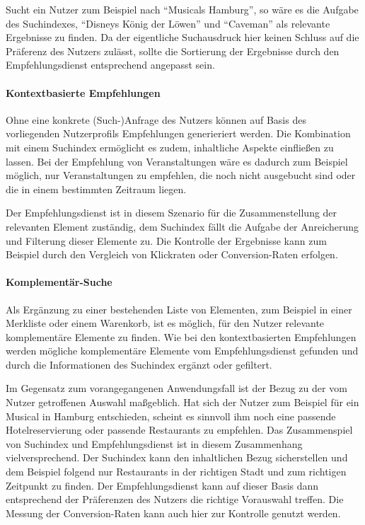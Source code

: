 Sucht ein Nutzer zum Beispiel nach ``Musicals Hamburg'', so wäre es die Aufgabe des Suchindexes, ``Disneys König der Löwen'' und ``Caveman'' als relevante Ergebnisse zu finden. Da der eigentliche Suchausdruck hier keinen Schluss auf die Präferenz des Nutzers zulässt, sollte die Sortierung der Ergebnisse durch den Empfehlungsdienst entsprechend angepasst sein.


\paragraph{Kontextbasierte Empfehlungen} Ohne eine konkrete (Such-)Anfrage des Nutzers können auf Basis des vorliegenden Nutzerprofils Empfehlungen generieriert werden.  Die Kombination mit einem Suchindex ermöglicht es zudem, inhaltliche Aspekte einfließen zu lassen. Bei der Empfehlung von Veranstaltungen wäre es dadurch zum Beispiel möglich, nur Veranstaltungen zu empfehlen, die noch nicht ausgebucht sind oder die in einem bestimmten Zeitraum liegen.

Der Empfehlungsdienst ist in diesem Szenario für die Zusammenstellung der relevanten Element zuständig, dem Suchindex fällt die Aufgabe der Anreicherung und Filterung dieser Elemente zu. Die Kontrolle der Ergebnisse kann zum Beispiel durch den Vergleich von Klickraten oder Conversion-Raten erfolgen.

\paragraph{Komplementär-Suche} Als Ergänzung zu einer bestehenden Liste von Elementen, zum Beispiel in einer Merkliste oder einem Warenkorb, ist es möglich, für den Nutzer relevante komplementäre Elemente zu finden. Wie bei den kontextbasierten Empfehlungen werden mögliche komplementäre Elemente vom Empfehlungsdienst gefunden und durch die Informationen des Suchindex ergänzt oder gefiltert.

Im Gegensatz zum vorangegangenen Anwendungsfall ist der Bezug zu der vom Nutzer getroffenen Auswahl maßgeblich. Hat sich der Nutzer zum Beispiel für ein Musical in Hamburg entschieden, scheint es sinnvoll ihm noch eine passende Hotelreservierung oder passende Restaurants zu empfehlen. Das Zusammenspiel von Suchindex und Empfehlungsdienst ist in diesem Zusammenhang vielversprechend. Der Suchindex kann den inhaltlichen Bezug sicherstellen und dem Beispiel folgend nur Restaurants in der richtigen Stadt und zum richtigen Zeitpunkt zu finden. Der Empfehlungsdienst kann auf dieser Basis dann entsprechend der Präferenzen des Nutzers die richtige Vorauswahl treffen. Die Messung der Conversion-Raten kann auch hier zur Kontrolle genutzt werden.

